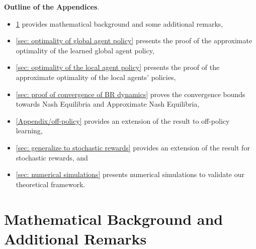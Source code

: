 \documentclass{article}
\theoremstyle{plain}
\theoremstyle{definition}
\begin{document}
\printAffiliationsAndNotice{}

 


  



\newpage

\appendix
\onecolumn

\textbf{Outline of the Appendices}.
\begin{itemize}
    \item \cref{sec: mathematical background and additional remarks} provides mathematical background and some additional remarks,
    \item \cref{sec: optimality of global agent policy} presents the proof of the approximate optimality of the learned global agent policy,
    \item \cref{sec: optimality of the local agent policy} presents the proof of the approximate optimality of the local agents' policies,
    \item \cref{sec: proof of convergence of BR dynamics} proves the convergence bounds towards Nash Equilibria and Approximate Nash Equilibria,
    \item \cref{Appendix/off-policy} provides an extension of the result to off-policy learning,
    \item \cref{sec: generalize to stochastic rewards} provides an extension of the result for stochastic rewards, and
    \item \cref{sec: numerical simulations} presents numerical simulations to validate our theoretical framework.\\                                 
\end{itemize}


\section{Mathematical Background and Additional Remarks}
\label{sec: mathematical background and additional remarks}
  
\end{document}
